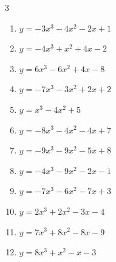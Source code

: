 \begin{multicols}{3}
\begin{enumerate}

  \item $y=-3x^{3}-4x^{2}-2x+1$


  \item $y=-4x^{3}+x^{2}+4x-2$


  \item $y=6x^{3}-6x^{2}+4x-8$


  \item $y=-7x^{3}-3x^{2}+2x+2$


  \item $y=x^{3}-4x^{2}+5$


  \item $y=-8x^{3}-4x^{2}-4x+7$


  \item $y=-9x^{3}-9x^{2}-5x+8$


  \item $y=-4x^{3}-9x^{2}-2x-1$


  \item $y=-7x^{3}-6x^{2}-7x+3$


\columnbreak %

  \item $y=2x^{3}+2x^{2}-3x-4$


  \item $y=7x^{3}+8x^{2}-8x-9$


  \item $y=8x^{3}+x^{2}-x-3$


\end{enumerate}
\end{multicols}
